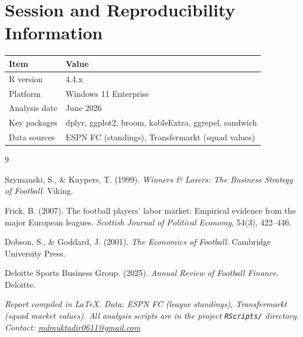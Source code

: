 \documentclass[11pt, a4paper]{article}
\begin{document}
\section{Session and Reproducibility Information}
\label{app:session}

\begin{center}
\small
\begin{tabular}{ll}
  \toprule
  \textbf{Item} & \textbf{Value} \\
  \midrule
  R version          & 4.4.x \\
  Platform           & Windows 11 Enterprise \\
  Analysis date      & June 2026 \\
  Key packages       & dplyr, ggplot2, broom, kableExtra, ggrepel, sandwich \\
  Data sources       & ESPN FC (standings), Transfermarkt (squad values) \\
  \bottomrule
\end{tabular}
\end{center}

\begin{thebibliography}{9}

Szymanski, S., \& Kuypers, T. (1999).
\textit{Winners \& Losers: The Business Strategy of Football}.
Viking.

Frick, B. (2007).
The football players' labor market: Empirical evidence from the major
European leagues.
\textit{Scottish Journal of Political Economy}, 54(3), 422--446.

Dobson, S., \& Goddard, J. (2001).
\textit{The Economics of Football}.
Cambridge University Press.

Deloitte Sports Business Group. (2025).
\textit{Annual Review of Football Finance}.
Deloitte.

\end{thebibliography}

\vfill
\noindent\small
\textit{Report compiled in \LaTeX{}. Data: ESPN FC (league standings),
Transfermarkt (squad market values). All analysis scripts are in the project
\texttt{RScripts/} directory. Contact:
\href{mailto:mdmuktadir0611@gmail.com}{mdmuktadir0611@gmail.com}}
\end{document}

